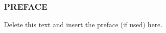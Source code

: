 
\begin{center}
\subsubsection*{PREFACE}
\end{center}

Delete this text and insert the preface (if used) here.

\newpage
